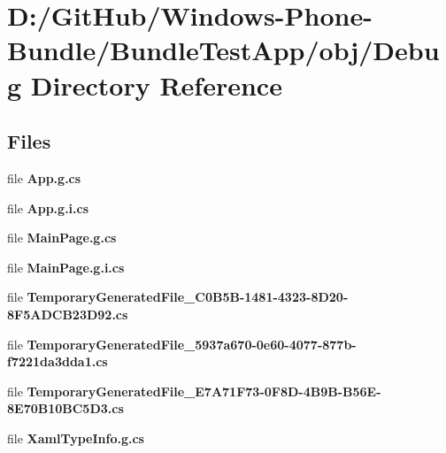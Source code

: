 \section{D\+:/\+Git\+Hub/\+Windows-\/\+Phone-\/\+Bundle/\+Bundle\+Test\+App/obj/\+Debug Directory Reference}
\label{dir_3f539a892fd46f8c82993d0ad401d5dd}
\subsection*{Files}
\begin{DoxyCompactItemize}
\item 
file {\bfseries App.\+g.\+cs}
\item 
file {\bfseries App.\+g.\+i.\+cs}
\item 
file {\bfseries Main\+Page.\+g.\+cs}
\item 
file {\bfseries Main\+Page.\+g.\+i.\+cs}
\item 
file {\bfseries Temporary\+Generated\+File\+\_\+C0\+B5\+B-\/1481-\/4323-\/8\+D20-\/8\+F5\+A\+D\+C\+B23\+D92.\+cs}
\item 
file {\bfseries Temporary\+Generated\+File\+\_\+5937a670-\/0e60-\/4077-\/877b-\/f7221da3dda1.\+cs}
\item 
file {\bfseries Temporary\+Generated\+File\+\_\+\+E7\+A71\+F73-\/0\+F8\+D-\/4\+B9\+B-\/\+B56\+E-\/8\+E70\+B10\+B\+C5\+D3.\+cs}
\item 
file {\bfseries Xaml\+Type\+Info.\+g.\+cs}
\end{DoxyCompactItemize}
